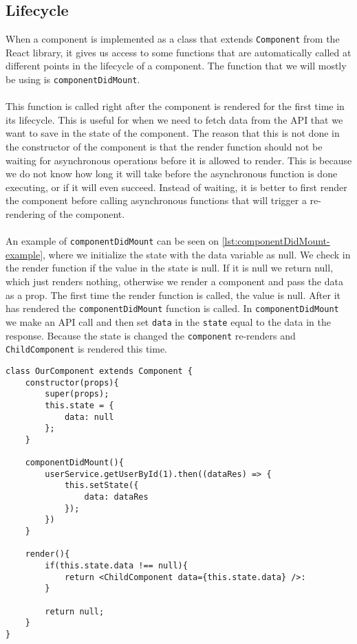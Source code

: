\subsection*{Lifecycle}
When a component is implemented as a class that extends \texttt{Component} from the React library, it gives us access to some functions that are automatically called at different points in the lifecycle of a component.
The function that we will mostly be using is \texttt{componentDidMount}.
\\\\
This function is called right after the component is rendered for the first time in its lifecycle.
This is useful for when we need to fetch data from the API that we want to save in the state of the component.
The reason that this is not done in the constructor of the component is that the render function should not be waiting for asynchronous operations before it is allowed to render.
This is because we do not know how long it will take before the asynchronous function is done executing, or if it will even succeed.
Instead of waiting, it is better to first render the component before calling asynchronous functions that will trigger a re-rendering of the component.
\\\\
An example of \texttt{componentDidMount} can be seen on \autoref{lst:componentDidMount-example}, where we initialize the state with the data variable as null.
We check in the render function if the value in the state is null.
If it is null we return null, which just renders nothing, otherwise we render a component and pass the data as a prop.
The first time the render function is called, the value is null.
After it has rendered the \texttt{componentDidMount} function is called.
In \texttt{componentDidMount} we make an API call and then set \texttt{data} in the \texttt{state} equal to the data in the response.
Because the state is changed the \texttt{component} re-renders and \texttt{ChildComponent} is rendered this time.

\begin{lstlisting}[caption={Example with the componentDidMount function}, label={lst:componentDidMount-example}, captionpos=b]
class OurComponent extends Component {
	constructor(props){
		super(props);
		this.state = {
			data: null
		};
	}

	componentDidMount(){
		userService.getUserById(1).then((dataRes) => {
			this.setState({
				data: dataRes
			});
		})
	}

	render(){
		if(this.state.data !== null){
			return <ChildComponent data={this.state.data} />:
		}
			
		return null;
	}
}
\end{lstlisting}
